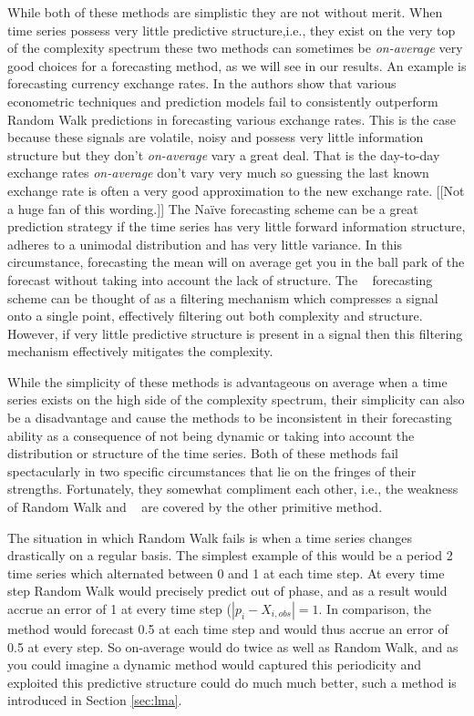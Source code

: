 While both of these methods are simplistic they are not without merit. When time series possess very little predictive structure,i.e., they exist on the very top of the complexity spectrum these two methods can sometimes be \emph{on-average} very good choices for a forecasting method, as we will see in our results. An example is forecasting currency exchange rates. In \cite{rwMeese,rwCCE} the authors show that various econometric techniques and prediction models fail to consistently outperform Random Walk predictions in forecasting various exchange rates. This is the case because these signals are volatile, noisy and possess very little information structure but they don't \emph{on-average} vary a great deal. That is the day-to-day exchange rates \emph{on-average} don't vary very much so guessing the last known exchange rate is often a very good approximation to the new exchange rate. [[Not a huge fan of this wording.]] The Na\"ive forecasting scheme can be a great prediction strategy if the time series has very little forward information structure, adheres to a unimodal distribution and has very little variance. In this circumstance, forecasting the mean will on average get you in the ball park of the forecast without taking into account the lack of structure. The \naive~ forecasting scheme can be thought of as a filtering mechanism which compresses a signal onto a single point, effectively filtering out both complexity and structure. However, if very little predictive structure is present in a signal then this filtering mechanism effectively mitigates the complexity.     

While the simplicity of these methods is advantageous on average when a time series exists on the high side of the complexity spectrum, their simplicity can also be a disadvantage and cause the methods to be inconsistent in their forecasting ability as a consequence of not being dynamic or taking into account the distribution or structure of the time series. Both of these methods fail spectacularly in two specific circumstances that lie on the fringes of their strengths. Fortunately, they somewhat compliment each other, i.e., the weakness of Random Walk and \naive~ are covered by the other primitive method. 

The situation in which Random Walk fails is when a time series changes drastically on a regular basis. The simplest example of this would be a period 2 time series which alternated between 0 and 1 at each time step. At every time step Random Walk would precisely predict out of phase, and as a result would accrue an error of 1 at every time step ($|p_i-X_{i,obs}|=1$. In comparison, the \naive method would forecast 0.5 at each time step and would thus accrue an error of 0.5 at every step. So on-average \naive would do twice as well as Random Walk, and as you could imagine a dynamic method would captured this periodicity  and exploited this predictive structure could do much much better, such a method is introduced in Section \ref{sec:lma}. 

